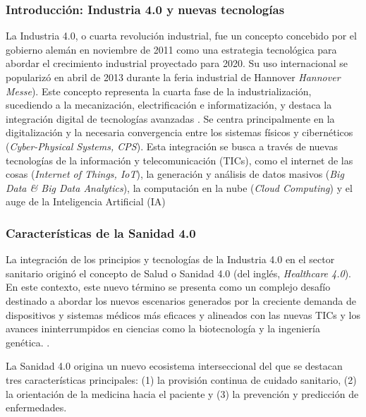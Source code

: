 \subsubsection{Introducción: Industria 4.0 y nuevas tecnologías}

La Industria 4.0, o cuarta revolución industrial, fue un concepto concebido por el gobierno alemán en noviembre de 2011 como una estrategia tecnológica para abordar el crecimiento industrial proyectado para 2020. Su uso internacional se popularizó en abril de 2013 durante la feria industrial de Hannover \textit{Hannover Messe}). Este concepto representa la cuarta fase de la industrialización, sucediendo a la mecanización, electrificación e informatización, y destaca la integración digital de tecnologías avanzadas \cite{lasi2014industry}.
Se centra principalmente en la digitalización y la necesaria convergencia entre los sistemas físicos y cibernéticos (\textit{Cyber-Physical Systems, CPS}). Esta integración se busca a través de nuevas tecnologías de la información y telecomunicación (TICs), como el internet de las cosas (\textit{Internet of Things, IoT}), la generación y análisis de datos masivos (\textit{Big Data \& Big Data Analytics}), la computación en la nube (\textit{Cloud Computing}) y el auge de la Inteligencia Artificial (IA) \cite{lasi2014industry}\cite{chen2020times}\cite{tortorella2020healthcare}

\subsubsection{Características de la Sanidad 4.0}

La integración de los principios y tecnologías de la Industria 4.0 en el sector sanitario originó el concepto de Salud o Sanidad 4.0 (del inglés, \textit{Healthcare 4.0})\cite{tortorella2020healthcare}\cite{tortorella2021impacts}.  %
En este contexto, este nuevo término se presenta como un complejo desafío  destinado a abordar los nuevos escenarios generados por la creciente demanda de dispositivos y sistemas médicos más eficaces y alineados con las nuevas TICs y los avances ininterrumpidos en ciencias como la biotecnología y la ingeniería genética. \cite{martin2021ehealth}. 

La Sanidad 4.0 origina un nuevo ecosistema interseccional del que se destacan tres  características principales: (1) la provisión continua de cuidado sanitario, (2) la orientación de la medicina hacia el paciente y (3) la prevención y predicción de enfermedades.


